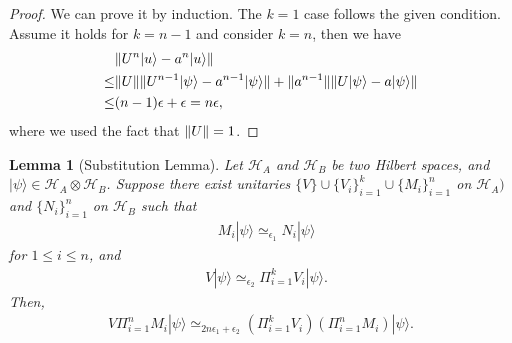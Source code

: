 \documentclass[11pt,letterpaper]{article}
\newcommand{\ket}[1]{|#1\rangle}
\newcommand{\x}{\otimes}
\DeclarePairedDelimiter{\norm}{\lVert}{\rVert}
\newcommand{\calH}{\mathcal{H}}
\newcommand{\1}{\mathbb{1}}
\newcommand{\ep}{\epsilon}
\newcommand{\appd}[1]{\simeq_{#1}}
\newtheorem{lemma}[theorem]{Lemma}
\theoremstyle{definition}
\begin{document}
\begin{proof}
	We can prove it by induction. 
	The $k=1$ case follows the given condition.
	Assume it holds for $k = n-1$ and consider $k = n$, then we have
	\begin{align*}
		&\norm{U^n \ket{u} - a^n\ket{u}} \\
		\leq &\norm{U} \norm{U^{n-1} \ket{\psi} - a^{n-1}\ket{\psi}} + \norm{a^{n-1}}
		\norm{U\ket{\psi} - a \ket{\psi}}\\
		\leq &(n-1)\ep + \ep = n \ep,
	\end{align*}
	where we used the fact that $\norm{U} = 1$.
\end{proof}
\begin{lemma}[Substitution Lemma]
    \label{lm:sub}
    Let $\calH_A$ and $\calH_B$ be two Hilbert spaces, and
    $\ket{\psi} \in \calH_A \x \calH_B$.
    Suppose there exist unitaries 
    $\{V\} \cup \{V_i\}_{i=1}^k \cup \{ M_i \}_{i=1}^n$ on $\calH_A)$ and
    $\{ N_i \}_{i=1}^n$ on $\calH_B$ such that
    \begin{align*}
        &M_i \ket{\psi} \appd{\ep_1} N_i \ket{\psi}
    \end{align*}
    for $1 \leq i \leq n$, and 
    \begin{align*}
        &V \ket{\psi} \appd{\ep_2} \Pi_{i=1}^k V_i \ket{\psi}.
    \end{align*}
    Then,
    \begin{align*}
        V\Pi_{i=1}^n M_i \ket{\psi} 
        \appd{2n\ep_1 + \ep_2} \left(\Pi_{i=1}^k V_i\right) 
        \left(\Pi_{i=1}^n M_i \right)\ket{\psi}.
    \end{align*}
\end{lemma}
\end{document}
